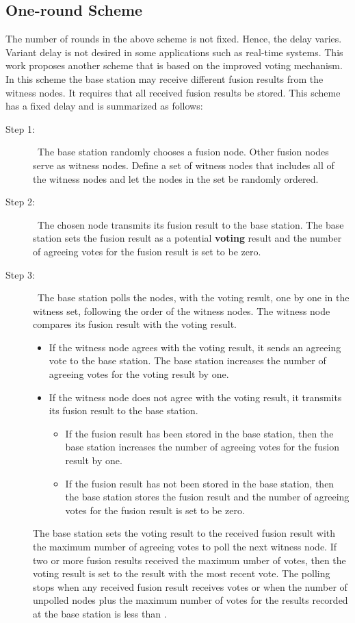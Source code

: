 \documentclass[12pt, onecolumn, draftcls]{IEEEtran}
\begin{document}
\subsection{One-round Scheme} The number of rounds in the above scheme is not
fixed. Hence, the delay varies. Variant delay is not desired in some
applications such as real-time systems. This work proposes another
scheme that is based on the improved voting mechanism. In this
scheme the base station may receive different fusion results from
the witness nodes. It requires that all received fusion results be
stored. This scheme has a fixed delay and is summarized  as follows:
\begin{description}
\item[Step 1: ]\ The base station randomly chooses a fusion node.
Other fusion nodes serve as witness nodes. Define a set of witness
nodes that includes all of the witness nodes and let the nodes in
the set be randomly ordered.

\item[Step 2: ]\ The chosen node transmits its fusion result to
the base station. The base station sets the fusion result as a
potential {\bf voting} result and the number of agreeing votes for
the fusion result is set to be zero.

\item[Step 3: ]\ The base station polls the nodes, with the voting
result, one by one in the witness set, following the order of the
witness nodes. The witness node compares its fusion result with the
voting result.
\begin{itemize}
 \item If the witness node agrees with the voting result, it sends
an agreeing vote to the base station. The base station increases the
number of agreeing votes for the voting result by one.
 \item If the witness node does not agree with the voting result,
it transmits its fusion result to the base station.
  \begin{itemize}
   \item If the fusion result has been stored in the base station, then the
    base station increases the number of agreeing votes for the fusion result
    by one.
   \item If the fusion result has not been stored in the base station,
    then the base station stores the fusion result and the number of agreeing
    votes for the fusion result is set to be zero.
  \end{itemize}
\end{itemize}
The base station sets the voting result to the received fusion
result with the maximum number of agreeing votes to poll the next
witness node. If two or more fusion results received the maximum
umber of votes, then the voting result is set to the result with the
most recent vote. The polling stops when any received fusion result
receives  votes or when the number of unpolled nodes plus the
maximum number of votes for the results recorded at the base station
is less than .
\end{description}
\end{document}
